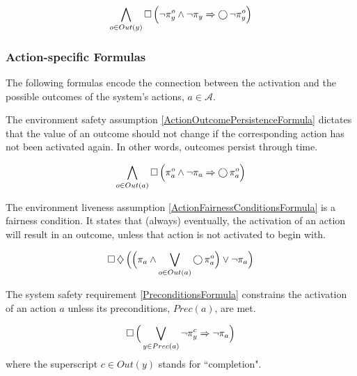 \begin{equation}\label{ActionOutcomeConstraintFormula}
	\bigwedge \limits_{o \in Out(y)} \operatorname{\Box} \Big( \lnot \pi_y^o \wedge \lnot \pi_y \Rightarrow \operatorname{\bigcirc} \lnot \pi_y^o \Big)
\end{equation}


\subsubsection{Action-specific Formulas}

The following formulas encode the connection between the activation and the possible outcomes of the system's actions, $a \in \mathcal{A}$.

The environment safety assumption \eqref{ActionOutcomePersistenceFormula} dictates that the value of an outcome should not change if the corresponding action has not been activated again. 
In other words, outcomes persist through time.

\begin{equation}\label{ActionOutcomePersistenceFormula}
	\bigwedge \limits_{o \in Out(a)} \operatorname{\Box} \Big( \pi_a^o \wedge \lnot \pi_a \Rightarrow \operatorname{\bigcirc} \pi_a^o \Big)
\end{equation}

The environment liveness assumption \eqref{ActionFairnessConditionsFormula} is a fairness condition.
It states that (always) eventually, the activation of an action will result in an outcome, unless that action is not activated to begin with.

\begin{equation}\label{ActionFairnessConditionsFormula}
	\operatorname{\Box} \operatorname{\diamondsuit} \Big( \Big( \pi_a \wedge \bigvee \limits_{o \in Out(a)} \operatorname{\bigcirc} \pi_a^o \Big) \vee \lnot \pi_a \Big)
\end{equation}

The system safety requirement \eqref{PreconditionsFormula} constrains the activation of an action $a$ unless its preconditions, $Prec(a)$, are met.

\begin{equation}\label{PreconditionsFormula}
	\operatorname{\Box} \Big( \bigvee \limits_{y \in Prec(a)} \lnot \pi_y^c \Rightarrow \lnot \pi_a \Big)
\end{equation}
where the superscript $c \in Out(y)$ stands for ``completion".


